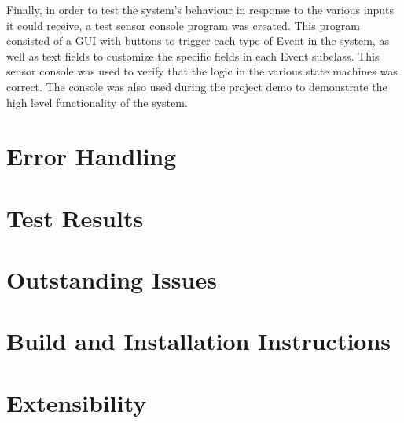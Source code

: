 \documentclass{article}
\begin{document}
Finally, in order to test the system's behaviour in response to the
various inputs it could receive, a test sensor console program was
created. This program consisted of a GUI with buttons to trigger each
type of Event in the system, as well as text fields to customize the
specific fields in each Event subclass. This sensor console was used
to verify that the logic in the various state machines was
correct. The console was also used during the project demo to
demonstrate the high level functionality of the system.

\section{Error Handling} 

\section{Test Results}

\section{Outstanding Issues} %

\section{Build and Installation Instructions}

\section{Extensibility}
\end{document}

